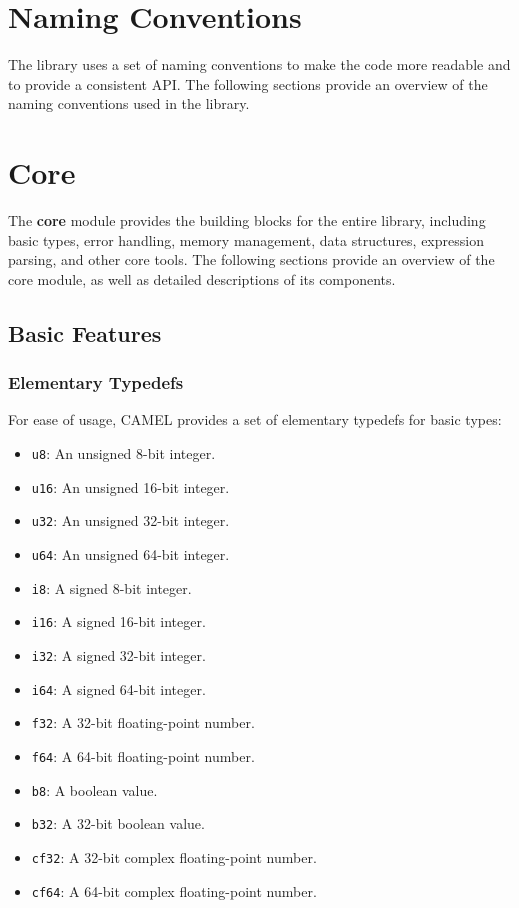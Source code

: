 \documentclass[a4paper,oneside,8pt]{extarticle}
\theoremstyle{definition}
\begin{document}
\section{Naming Conventions} \label{sec:naming_conventions}

The library uses a set of naming conventions to make the code more readable and to provide a consistent API. The following sections provide an overview of the naming conventions used in the library.

\section{Core} \label{sec:core}

The \textbf{core} module provides the building blocks for the entire library, including basic types, error handling, memory management, data structures, expression parsing, and other core tools. The following sections provide an overview of the core module, as well as detailed descriptions of its components.

\subsection{Basic Features}

\subsubsection{Elementary Typedefs}

For ease of usage, CAMEL provides a set of elementary typedefs for basic types:

\begin{itemize}
  \item \texttt{u8}: An unsigned 8-bit integer.
  \item \texttt{u16}: An unsigned 16-bit integer.
  \item \texttt{u32}: An unsigned 32-bit integer.
  \item \texttt{u64}: An unsigned 64-bit integer.
  \item \texttt{i8}: A signed 8-bit integer.
  \item \texttt{i16}: A signed 16-bit integer.
  \item \texttt{i32}: A signed 32-bit integer.
  \item \texttt{i64}: A signed 64-bit integer.
  \item \texttt{f32}: A 32-bit floating-point number.
  \item \texttt{f64}: A 64-bit floating-point number.
  \item \texttt{b8}: A boolean value.
  \item \texttt{b32}: A 32-bit boolean value.
  \item \texttt{cf32}: A 32-bit complex floating-point number.
  \item \texttt{cf64}: A 64-bit complex floating-point number.
\end{itemize}
\end{document}
